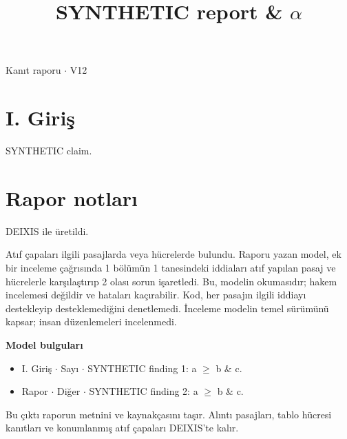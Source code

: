 \documentclass[journal]{IEEEtran}
\begin{document}
\renewcommand{\abstractname}{Özet}
\renewcommand{\IEEEkeywordsname}{Dizin Terimleri}
\renewcommand{\refname}{Kaynaklar}

\title{SYNTHETIC report \& \ensuremath{\alpha}}

\maketitle

\noindent Kanıt raporu \ensuremath{\cdot} V12

\section*{I. Giriş}

SYNTHETIC claim. \cite{Synth26}

\section*{Rapor notları}

DEIXIS ile üretildi.

Atıf çapaları ilgili pasajlarda veya hücrelerde bulundu. Raporu yazan model, ek bir inceleme çağrısında 1 bölümün 1 tanesindeki iddiaları atıf yapılan pasaj ve hücrelerle karşılaştırıp 2 olası sorun işaretledi. Bu, modelin okumasıdır; hakem incelemesi değildir ve hataları kaçırabilir. Kod, her pasajın ilgili iddiayı destekleyip desteklemediğini denetlemedi. İnceleme modelin temel sürümünü kapsar; insan düzenlemeleri incelenmedi.

\noindent\textbf{Model bulguları}

\begin{itemize}
\item I. Giriş \ensuremath{\cdot} Sayı \ensuremath{\cdot} SYNTHETIC finding 1: a \ensuremath{\geq} b \& c.
\item Rapor \ensuremath{\cdot} Diğer \ensuremath{\cdot} SYNTHETIC finding 2: a \ensuremath{\geq} b \& c.
\end{itemize}

Bu çıktı raporun metnini ve kaynakçasını taşır. Alıntı pasajları, tablo hücresi kanıtları ve konumlanmış atıf çapaları DEIXIS'te kalır.




\end{document}
